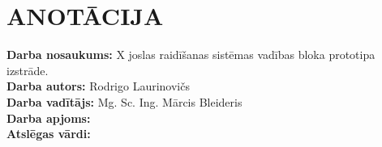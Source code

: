 \chapter*{ANOTĀCIJA}
\begin{flushleft}
\textbf{Darba nosaukums:} X joslas raidīšanas sistēmas vadības bloka prototipa izstrāde.\\
\textbf{Darba autors:} Rodrigo Laurinovičs\\
\textbf{Darba vadītājs:} Mg. Sc. Ing. Mārcis Bleideris\\
\textbf{Darba apjoms:} \\
\textbf{Atslēgas vārdi:} 
\end{flushleft}

